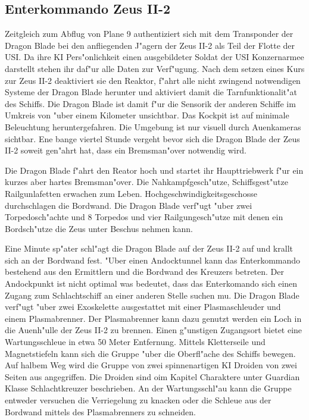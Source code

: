 \subsection{Enterkommando Zeus II-2}
Zeitgleich zum Abflug von Plane 9 authentiziert sich \xl{} mit dem Transponder der Dragon Blade bei den anfliegenden J"agern der Zeus II-2 als Teil der Flotte der USI. Da ihre KI Pers"onlichkeit einen ausgebildeter Soldat der USI Konzernarmee darstellt stehen ihr daf"ur alle Daten zur Verf"ugung. Nach dem setzen eines Kurs zur Zeus II-2 deaktiviert sie den Reaktor, f"ahrt alle nicht zwingend notwendigen Systeme der Dragon Blade herunter und aktiviert damit die Tarnfunktionalit"at des Schiffs. Die Dragon Blade ist damit f"ur die Sensorik der anderen Schiffe im Umkreis von "uber einem Kilometer unsichtbar. Das Kockpit ist auf minimale Beleuchtung heruntergefahren. Die Umgebung ist nur visuell durch Au\3enkameras sichtbar. Ene bange viertel Stunde vergeht bevor sich die Dragon Blade der Zeus II-2 soweit gen"ahrt hat, dass ein Bremsman"over notwendig wird.

Die Dragon Blade f"ahrt den Reator hoch und startet ihr Haupttriebwerk f"ur ein kurzes aber hartes Bremsman"over. Die Nahkampfgesch"utze, Schiffsgest"utze Railgunlafetten erwachen zum Leben. Hochgeschwindigkeitsgeschosse durchschlagen die Bordwand. Die Dragon Blade verf"ugt "uber zwei Torpedosch"achte und 8 Torpedos und vier Railgungesch"utze mit denen ein Bordsch"utze die Zeus unter Beschus\3 nehmen kann. 

Eine Minute sp"ater schl"agt die Dragon Blade auf der Zeus II-2 auf und krallt sich an der Bordwand fest. "Uber einen Andocktunnel kann das Enterkommando bestehend aus den Ermittlern und \xl{} die Bordwand des Kreuzers betreten. Der Andockpunkt ist nicht optimal was bedeutet, dass das Enterkomando sich einen Zugang zum Schlachtschiff an einer anderen Stelle suchen mu\3. Die Dragon Blade verf"ugt "uber zwei Exoskelette ausgestattet mit einer Plasmaschleuder und einem Plasmabrenner. Der Plasmabrenner kann dazu genutzt werden ein Loch in die Au\3enh"ulle der Zeus II-2 zu brennen. Einen g"unstigen Zugangsort bietet eine Wartungsschleu\3e in etwa 50 Meter Entfernung. Mittels Kletterseile und Magnetstiefeln kann sich die Gruppe "uber die Oberfl"ache des Schiffs bewegen. Auf halbem Weg wird die Gruppe von zwei spinnenartigen KI Droiden von zwei Seiten aus angegriffen. Die Droiden sind oim Kapitel Charaktere unter Guardian Klasse Schlachtkreuzer beschrieben. An der Wartungsschl"au\3 kann die Gruppe entweder versuchen die Verriegelung zu knacken oder die Schleu\3e aus der Bordwand mittels des Plasmabrenners zu schneiden.

